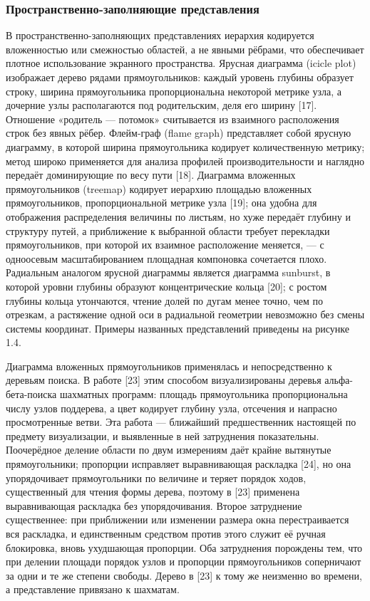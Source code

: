 \subsubsection{Пространственно-заполняющие представления}

В пространственно-заполняющих представлениях иерархия кодируется вложенностью или смежностью областей, а не явными рёбрами, что обеспечивает плотное использование экранного пространства. Ярусная диаграмма (icicle plot) изображает дерево рядами прямоугольников: каждый уровень глубины образует строку, ширина прямоугольника пропорциональна некоторой метрике узла, а дочерние узлы располагаются под родительским, деля его ширину [17]. Отношение «родитель — потомок» считывается из взаимного расположения строк без явных рёбер. Флейм-граф (flame graph) представляет собой ярусную диаграмму, в которой ширина прямоугольника кодирует количественную метрику; метод широко применяется для анализа профилей производительности и наглядно передаёт доминирующие по весу пути [18]. Диаграмма вложенных прямоугольников (treemap) кодирует иерархию площадью вложенных прямоугольников, пропорциональной метрике узла [19]; она удобна для отображения распределения величины по листьям, но хуже передаёт глубину и структуру путей, а приближение к выбранной области требует перекладки прямоугольников, при которой их взаимное расположение меняется, — с одноосевым масштабированием площадная компоновка сочетается плохо. Радиальным аналогом ярусной диаграммы является диаграмма sunburst, в которой уровни глубины образуют концентрические кольца [20]; с ростом глубины кольца утончаются, чтение долей по дугам менее точно, чем по отрезкам, а растяжение одной оси в радиальной геометрии невозможно без смены системы координат. Примеры названных представлений приведены на рисунке 1.4.


Диаграмма вложенных прямоугольников применялась и непосредственно к деревьям поиска. В работе [23] этим способом визуализированы деревья альфа-бета-поиска шахматных программ: площадь прямоугольника пропорциональна числу узлов поддерева, а цвет кодирует глубину узла, отсечения и напрасно просмотренные ветви. Эта работа — ближайший предшественник настоящей по предмету визуализации, и выявленные в ней затруднения показательны. Поочерёдное деление области по двум измерениям даёт крайне вытянутые прямоугольники; пропорции исправляет выравнивающая раскладка [24], но она упорядочивает прямоугольники по величине и теряет порядок ходов, существенный для чтения формы дерева, поэтому в [23] применена выравнивающая раскладка без упорядочивания. Второе затруднение существеннее: при приближении или изменении размера окна перестраивается вся раскладка, и единственным средством против этого служит её ручная блокировка, вновь ухудшающая пропорции. Оба затруднения порождены тем, что при делении площади порядок узлов и пропорции прямоугольников соперничают за одни и те же степени свободы. Дерево в [23] к тому же неизменно во времени, а представление привязано к шахматам.

